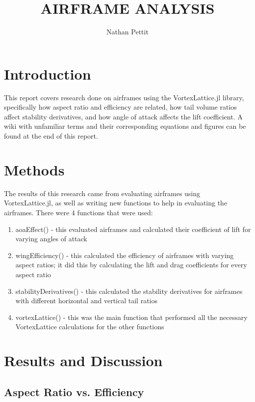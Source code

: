 \documentclass{journal}
\title{AIRFRAME ANALYSIS}
\author{Nathan Pettit}
\begin{document}
	
	\maketitle	
	
	\section{Introduction}
	
	This report covers research done on airframes using the VortexLattice.jl library, specifically how aspect ratio and efficiency are related, how tail volume ratios affect stability derivatives, and how angle of attack affects the lift coefficient. A wiki with unfamiliar terms and their corresponding equations and figures can be found at the end of this report.
	
	\section{Methods}
	The results of this research came from evaluating airframes using VortexLattice.jl, as well as writing new functions to help in evaluating the airframes. There were 4 functions that were  used:
	
	\begin{enumerate}
		\item aoaEffect() - this evaluated airframes and calculated their coefficient of lift for varying angles of attack 
		\item wingEfficiency() - this calculated the efficiency of airframes with varying aspect ratios; it did this by calculating the lift and drag coefficients for every aspect ratio
		\item stabilityDerivatives() - this calculated the stability derivatives for airframes with different horizontal and vertical tail ratios
		\item vortexLattice() - this was the main function that performed all the necessary VortexLattice calculations for the other functions 
	\end{enumerate}
	
	\section{Results and Discussion}
	
	\subsection{Aspect Ratio vs. Efficiency}
	
\end{document}
